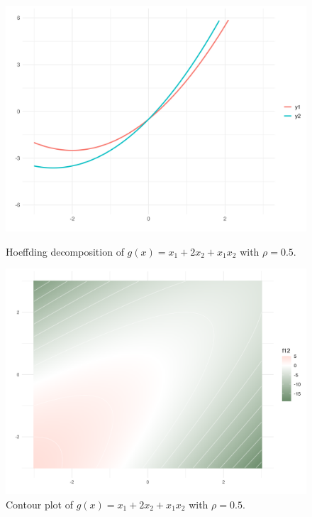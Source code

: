 \begin{figure}[htpb]
    \centering
    \begin{minipage}[t]{0.49\textwidth}
        \centering
        \includegraphics[width=\textwidth]{images/hoeffding_rho05.png}
        \caption{Hoeffding decomposition of $g(x) = x_1 + 2 x_2 + x_1 x_2$ with $\rho = 0.5$.}
        \label{fig:hoeffding_rho05}
    \end{minipage}%
    \hfill
    \begin{minipage}[t]{0.49\textwidth}
        \centering
        \includegraphics[width=\textwidth]{images/hoeffding_contour_rho05.png}
        \caption{Contour plot of $g(x) = x_1 + 2 x_2 + x_1 x_2$ with $\rho = 0.5$.}
        \label{fig:hoeffding_contour_rho05}
    \end{minipage}
\end{figure}
